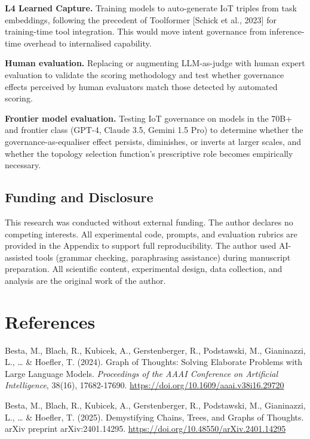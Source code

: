 \documentclass[11pt,a4paper]{article}
\begin{document}
\textbf{L4 Learned Capture.} Training models to auto-generate IoT
triples from task embeddings, following the precedent of Toolformer
{[}Schick et al., 2023{]} for training-time tool integration. This would
move intent governance from inference-time overhead to internalised
capability.

\textbf{Human evaluation.} Replacing or augmenting LLM-as-judge with
human expert evaluation to validate the scoring methodology and test
whether governance effects perceived by human evaluators match those
detected by automated scoring.

\textbf{Frontier model evaluation.} Testing IoT governance on models in
the 70B+ and frontier class (GPT-4, Claude 3.5, Gemini 1.5 Pro) to
determine whether the governance-as-equaliser effect persists,
diminishes, or inverts at larger scales, and whether the topology
selection function's prescriptive role becomes empirically necessary.

\subsection{Funding and Disclosure}\label{funding-and-disclosure}

This research was conducted without external funding. The author
declares no competing interests. All experimental code, prompts, and
evaluation rubrics are provided in the Appendix to support full
reproducibility. The author used AI-assisted tools (grammar checking,
paraphrasing assistance) during manuscript preparation. All scientific
content, experimental design, data collection, and analysis are the
original work of the author.

\section{References}\label{references}

Besta, M., Blach, R., Kubicek, A., Gerstenberger, R., Podstawski, M.,
Gianinazzi, L., \ldots{} \& Hoefler, T. (2024). Graph of Thoughts:
Solving Elaborate Problems with Large Language Models. \emph{Proceedings
of the AAAI Conference on Artificial Intelligence}, 38(16), 17682-17690.
\url{https://doi.org/10.1609/aaai.v38i16.29720}

Besta, M., Blach, R., Kubicek, A., Gerstenberger, R., Podstawski, M.,
Gianinazzi, L., \ldots{} \& Hoefler, T. (2025). Demystifying Chains,
Trees, and Graphs of Thoughts. arXiv preprint arXiv:2401.14295.
\url{https://doi.org/10.48550/arXiv.2401.14295}
\end{document}
